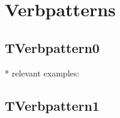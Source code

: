 \section {Verbpatterns}
\subsection {TVerbpattern0}
\begin{description}
\item[* relevant examples:]\mbox{}
\end{description}

\subsection{TVerbpattern1}
